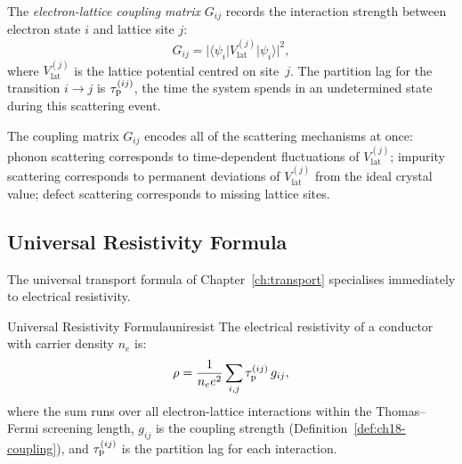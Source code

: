 \begin{definition}
\label{def:ch18-coupling}
The \emph{electron-lattice coupling matrix} $G_{ij}$ records the
interaction strength between electron state $i$ and lattice site $j$:
\begin{equation}
  G_{ij} = \bigl\lvert \langle \psi_i \rvert
    V_{\mathrm{lat}}^{(j)} \lvert \psi_i \rangle\bigr\rvert^2,
  \label{eq:ch18-Gij}
\end{equation}
where $V_{\mathrm{lat}}^{(j)}$ is the lattice potential centred on
site~$j$.  The partition lag for the transition $i \to j$ is
$\tau_{\mathrm{p}}^{(ij)}$, the time the system spends in an undetermined state during
this scattering event.
\end{definition}

The coupling matrix $G_{ij}$ encodes all of the scattering mechanisms at
once: phonon scattering corresponds to time-dependent fluctuations of
$V_{\mathrm{lat}}^{(j)}$; impurity scattering corresponds to permanent
deviations of $V_{\mathrm{lat}}^{(j)}$ from the ideal crystal value; defect
scattering corresponds to missing lattice sites.

\subsection{Universal Resistivity Formula}

The universal transport formula of Chapter~\ref{ch:transport} specialises
immediately to electrical resistivity.

\begin{consequence}{Universal Resistivity Formula}{uniresist}
The electrical resistivity of a conductor with carrier density $n_e$ is:
\begin{equation}
  \rho = \frac{1}{n_e e^2} \sum_{i,j}\tau_{\mathrm{p}}^{(ij)}\, g_{ij},
  \label{eq:ch18-uniresist}
\end{equation}
where the sum runs over all electron-lattice interactions within the
Thomas--Fermi screening length, $g_{ij}$ is the coupling strength
(Definition~\ref{def:ch18-coupling}), and $\tau_{\mathrm{p}}^{(ij)}$ is the
partition lag for each interaction.
\end{consequence}

